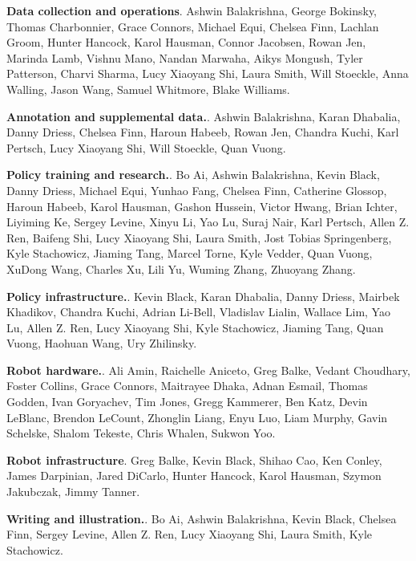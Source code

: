\documentclass[conference]{IEEEtran}
\begin{document}
\noindent\textbf{Data collection and operations}. Ashwin Balakrishna, George Bokinsky, Thomas Charbonnier, Grace Connors, Michael Equi, Chelsea Finn, Lachlan Groom, Hunter Hancock, Karol Hausman, Connor Jacobsen, Rowan Jen, Marinda Lamb, Vishnu Mano, Nandan Marwaha, Aikys Mongush, Tyler Patterson, Charvi Sharma, Lucy Xiaoyang Shi, Laura Smith, Will Stoeckle, Anna Walling, Jason Wang, Samuel Whitmore, Blake Williams.

\noindent\textbf{Annotation and supplemental data.}. Ashwin Balakrishna, Karan Dhabalia, Danny Driess, Chelsea Finn, Haroun Habeeb, Rowan Jen, Chandra Kuchi, Karl Pertsch, Lucy Xiaoyang Shi, Will Stoeckle, Quan Vuong.

\noindent\textbf{Policy training and research.}. Bo Ai, Ashwin Balakrishna, Kevin Black, Danny Driess, Michael Equi, Yunhao Fang, Chelsea Finn, Catherine Glossop, Haroun Habeeb, Karol Hausman, Gashon Hussein, Victor Hwang, Brian Ichter, Liyiming Ke, Sergey Levine, Xinyu Li, Yao Lu, Suraj Nair, Karl Pertsch, Allen Z. Ren, Baifeng Shi, Lucy Xiaoyang Shi, Laura Smith, Jost Tobias Springenberg, Kyle Stachowicz, Jiaming Tang, Marcel Torne, Kyle Vedder, Quan Vuong, XuDong Wang, Charles Xu, Lili Yu, Wuming Zhang, Zhuoyang Zhang.

\noindent\textbf{Policy infrastructure.}. Kevin Black, Karan Dhabalia, Danny Driess, Mairbek Khadikov, Chandra Kuchi, Adrian Li-Bell, Vladislav Lialin, Wallace Lim, Yao Lu, Allen Z. Ren, Lucy Xiaoyang Shi, Kyle Stachowicz, Jiaming Tang, Quan Vuong, Haohuan Wang, Ury Zhilinsky.

\noindent\textbf{Robot hardware.}. Ali Amin, Raichelle Aniceto, Greg Balke, Vedant Choudhary, Foster Collins, Grace Connors, Maitrayee Dhaka, Adnan Esmail, Thomas Godden, Ivan Goryachev, Tim Jones, Gregg Kammerer, Ben Katz, Devin LeBlanc, Brendon LeCount, Zhonglin Liang, Enyu Luo, Liam Murphy, Gavin Schelske, Shalom Tekeste, Chris Whalen, Sukwon Yoo.

\noindent\textbf{Robot infrastructure}. Greg Balke, Kevin Black, Shihao Cao, Ken Conley, James Darpinian, Jared DiCarlo, Hunter Hancock, Karol Hausman, Szymon Jakubczak, Jimmy Tanner.

\noindent\textbf{Writing and illustration.}. Bo Ai, Ashwin Balakrishna, Kevin Black, Chelsea Finn, Sergey Levine, Allen Z. Ren, Lucy Xiaoyang Shi, Laura Smith, Kyle Stachowicz.
\end{document}
